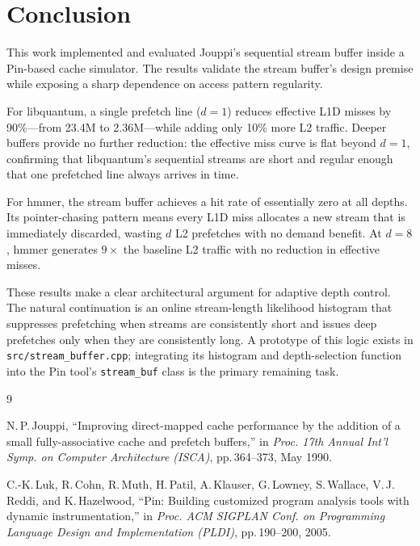 \documentclass[10pt,twocolumn]{article}
\begin{document}
\section{Conclusion}

This work implemented and evaluated Jouppi's sequential stream buffer
inside a Pin-based cache simulator. The results validate the stream
buffer's design premise while exposing a sharp dependence on access
pattern regularity.

For libquantum, a single prefetch line ($d=1$) reduces effective L1D
misses by 90\%---from 23.4M to 2.36M---while adding only 10\% more L2
traffic. Deeper buffers provide no further reduction: the effective miss
curve is flat beyond $d=1$, confirming that libquantum's sequential
streams are short and regular enough that one prefetched line always
arrives in time.

For hmmer, the stream buffer achieves a hit rate of essentially zero at
all depths. Its pointer-chasing pattern means every L1D miss allocates a
new stream that is immediately discarded, wasting $d$ L2 prefetches with
no demand benefit. At $d=8$, hmmer generates $9\times$ the baseline L2
traffic with no reduction in effective misses.

These results make a clear architectural argument for adaptive depth
control. The natural continuation is an online stream-length likelihood
histogram that suppresses prefetching when streams are consistently short
and issues deep prefetches only when they are consistently long. A
prototype of this logic exists in \texttt{src/stream\_buffer.cpp};
integrating its histogram and depth-selection function into the Pin
tool's \texttt{stream\_buf} class is the primary remaining task.

\begin{thebibliography}{9}

N.\,P.\,Jouppi,
``Improving direct-mapped cache performance by the addition of a small
fully-associative cache and prefetch buffers,''
in \textit{Proc. 17th Annual Int'l Symp. on Computer Architecture
(ISCA)}, pp.\,364--373, May 1990.

C.-K.\,Luk, R.\,Cohn, R.\,Muth, H.\,Patil, A.\,Klauser, G.\,Lowney,
S.\,Wallace, V.\,J.\,Reddi, and K.\,Hazelwood,
``Pin: Building customized program analysis tools with dynamic
instrumentation,''
in \textit{Proc. ACM SIGPLAN Conf. on Programming Language Design and
Implementation (PLDI)}, pp.\,190--200, 2005.

\end{thebibliography}
\end{document}

